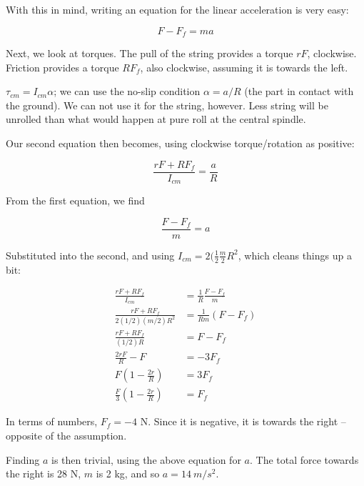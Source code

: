 \documentclass[8.01x]{subfiles}
\begin{document}
With this in mind, writing an equation for the linear acceleration is very easy:

\begin{equation}
F - F_f = m a
\end{equation}

Next, we look at torques. The pull of the string provides a torque $r F$, clockwise.\\
Friction provides a torque $R F_f$, also clockwise, assuming it is towards the left.

$\tau_{cm} = I_{cm} \alpha$; we can use the no-slip condition $\alpha = a/R$ (the part in contact with the ground). We can not use it for the string, however. Less string will be unrolled than what would happen at pure roll at the central spindle.

Our second equation then becomes, using clockwise torque/rotation as positive:

\begin{equation}
\frac{r F + R F_f}{I_{cm}} = \frac{a}{R}
\end{equation}

From the first equation, we find

\begin{equation}
\frac{F - F_f}{m} = a
\end{equation}

Substituted into the second, and using $I_{cm} = 2(\frac{1}{2} \frac{m}{2} R^2$, which cleans things up a bit:

\begin{align}
\frac{r F + R F_f}{I_{cm}} &= \frac{1}{R} \frac{F - F_f}{m}\\
\frac{r F + R F_f}{2(1/2)(m/2) R^2} &= \frac{1}{R m} (F - F_f)\\
\frac{r F + R F_f}{(1/2) R} &= F - F_f\\
\frac{2 r F}{R} - F &= - 3 F_f\\
F\left(1 - \frac{2 r}{R}\right) &= 3 F_f\\
\frac{F}{3}\left(1 - \frac{2 r}{R}\right) &= F_f
\end{align}

In terms of numbers, $F_f = -4$ N. Since it is negative, it is towards the right -- opposite of the assumption.

Finding $a$ is then trivial, using the above equation for $a$. The total force towards the right is 28 N, $m$ is 2 kg, and so $a = \SI{14}{m/s^2}$.
\end{document}
